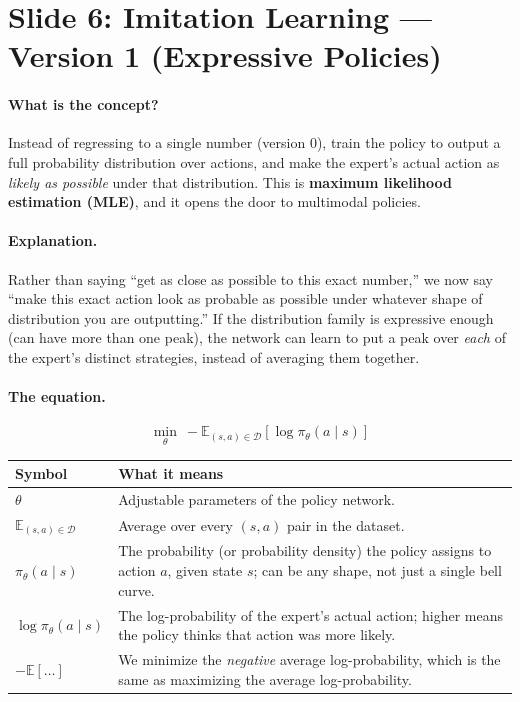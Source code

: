 \documentclass[11pt]{article}
\begin{document}
\section{Slide 6: Imitation Learning --- Version 1 (Expressive Policies)}

\paragraph{What is the concept?}
Instead of regressing to a single number (version 0), train the policy to output a full
probability distribution over actions, and make the expert's actual action as
\emph{likely as possible} under that distribution. This is \textbf{maximum likelihood
estimation (MLE)}, and it opens the door to multimodal policies.

\paragraph{Explanation.}
Rather than saying ``get as close as possible to this exact number,'' we now say ``make
this exact action look as probable as possible under whatever shape of distribution you
are outputting.'' If the distribution family is expressive enough (can have more than
one peak), the network can learn to put a peak over \emph{each} of the expert's distinct
strategies, instead of averaging them together.

\paragraph{The equation.}
$$\min_\theta \ -\mathbb{E}_{(s,a)\in\mathcal{D}}\left[\log \pi_\theta(a\mid s)\right]$$

\begin{center}
\begin{tabular}{@{}p{3.2cm}p{10.3cm}@{}}
\toprule
Symbol & What it means \\
\midrule
$\theta$ & Adjustable parameters of the policy network. \\
$\mathbb{E}_{(s,a)\in\mathcal{D}}$ & Average over every $(s,a)$ pair in the dataset. \\
$\pi_\theta(a\mid s)$ & The probability (or probability density) the policy assigns to
action $a$, given state $s$; can be any shape, not just a single bell curve. \\
$\log \pi_\theta(a\mid s)$ & The log-probability of the expert's actual action; higher
means the policy thinks that action was more likely. \\
$-\mathbb{E}[\ldots]$ & We minimize the \emph{negative} average log-probability, which is
the same as maximizing the average log-probability. \\
\bottomrule
\end{tabular}
\end{center}
\end{document}
